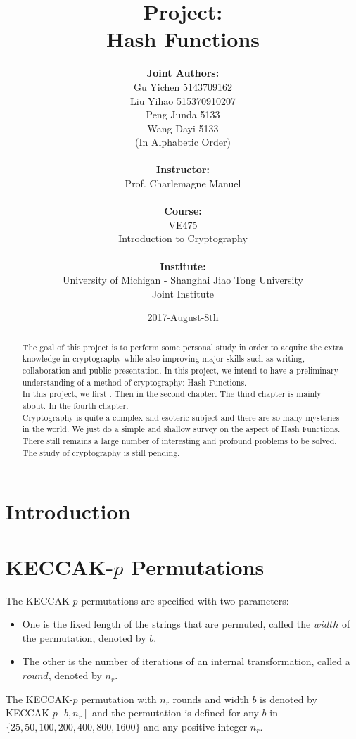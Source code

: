 \documentclass[12pt,a4paper,oneside]{report}
\author{
    \textbf{Joint Authors:}\\
    Gu Yichen 5143709162\\
    Liu Yihao 515370910207\\
    Peng Junda 5133\\
    Wang Dayi 5133\\
    \normalsize{(In Alphabetic Order)}\\
    \\
    \textbf{Instructor:}\\
    Prof. Charlemagne Manuel\\ \\ \textbf{Course:}\\VE475\\ Introduction to Cryptography\\ \\ \textbf{Institute:}\\University of Michigan - Shanghai Jiao Tong University\\Joint Institute}
\title{\textbf{Project:\\Hash Functions}}
\date{2017-August-8th}
\begin{document}
\maketitle

\begin{abstract}

The goal of this project is to perform some personal study in order to acquire the extra knowledge in cryptography while also improving major skills such as writing, collaboration and public presentation. In this project, we intend to have a preliminary understanding of a method of cryptography: Hash Functions.\\

In this project, we first . Then in the second chapter. The third chapter is mainly about. In the fourth chapter.\\

Cryptography is quite a complex and esoteric subject and there are so many mysteries in the world. We just do a simple and shallow survey on the aspect of Hash Functions. There still remains a large number of interesting and profound problems to be solved. The study of cryptography is still pending.\\

\end{abstract}


\tableofcontents
\chapter{  Introduction}

\chapter{KECCAK-$p$ Permutations}
The KECCAK-$p$ permutations are specified with two parameters:
\begin{itemize}
    \item One is the fixed length of the strings that are permuted, called the $width$ of the permutation, denoted by $b$.
    \item The other is the number of iterations of an internal transformation, called a $round$, denoted by $n_r$.
\end{itemize}

The KECCAK-$p$ permutation with $n_r$ rounds and width $b$ is denoted by KECCAK-$p[b, n_r]$ and the permutation is defined for any $b$ in $\{25,50,100,200,400,800,1600\}$ and any positive integer $n_r$.\\
\end{document}
